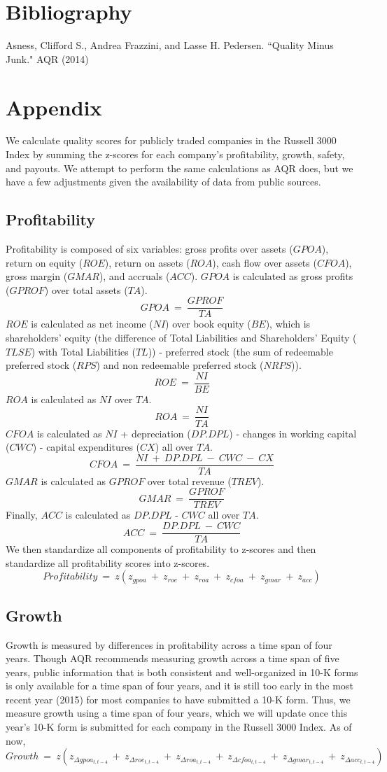 \documentclass[12pt]{article}
\begin{document}
\section*{Bibliography}
Asness, Clifford S., Andrea Frazzini, and Lasse H. Pedersen. ``Quality Minus Junk." AQR (2014)
\section*{Appendix}
We calculate quality scores for publicly traded companies in the Russell 3000 Index by summing the z-scores for each company's profitability, growth, safety, and payouts. We attempt to perform the same calculations as AQR does, but we have a few adjustments given the availability of data from public sources. 
\subsection*{Profitability}
Profitability is composed of six variables: gross profits over assets ($GPOA$), return on equity ($ROE$), return on assets ($ROA$), cash flow over assets ($CFOA$), gross margin ($GMAR$), and accruals ($ACC$). $GPOA$ is calculated as gross profits ($GPROF$) over total assets ($TA$). $$GPOA \ = \ \frac{GPROF}{TA}$$ $ROE$ is calculated as net income ($NI$) over book equity ($BE$), which is shareholders' equity (the difference of Total Liabilities and Shareholders' Equity ($TLSE$) with Total Liabilities ($TL$)) - preferred stock (the sum of redeemable preferred stock ($RPS$) and non redeemable preferred stock ($NRPS$)). $$ROE \ = \ \frac{NI}{BE}$$ $ROA$ is calculated as $NI$ over $TA$. $$ROA \ = \ \frac{NI}{TA}$$ $CFOA$ is calculated as $NI$ + depreciation ($DP.DPL$) - changes in working capital ($CWC$) - capital expenditures ($CX$) all over $TA$. $$CFOA \ = \ \frac{NI \ + \ DP.DPL \ - \ CWC \ - \ CX}{TA}$$ $GMAR$ is calculated as $GPROF$ over total revenue ($TREV$). $$GMAR \ = \ \frac{GPROF}{TREV}$$ Finally, $ACC$ is calculated as $DP.DPL$ - $CWC$ all over $TA$. $$ACC \ = \ \frac{DP.DPL \ - \ CWC}{TA}$$ We then standardize all components of profitability to z-scores and then standardize all profitability scores into z-scores. $$Profitability \ = \ z(z_{gpoa} \ + \ z_{roe} \ + \ z_{roa} \ + \ z_{cfoa} \ + \ z_{gmar} \ + \ z_{acc})$$
\subsection*{Growth}
Growth is measured by differences in profitability across a time span of four years. Though AQR recommends measuring growth across a time span of five years, public information that is both consistent and well-organized in 10-K forms is only available for a time span of four years, and it is still too early in the most recent year (2015) for most companies to have submitted a 10-K form. Thus, we measure growth using a time span of four years, which we will update once this year's 10-K form is submitted for each company in the Russell 3000 Index. As of now, $$Growth \ = \ z(z_{\Delta gpoa_{t,t-4}} \ + \ z_{\Delta roe_{t,t-4}} \ + \ z_{\Delta roa_{t,t-4}} \ + \ z_{\Delta cfoa_{t,t-4}} \ + \ z_{\Delta gmar_{t,t-4}} \ + \ z_{\Delta acc_{t,t-4}})$$
\end{document}
